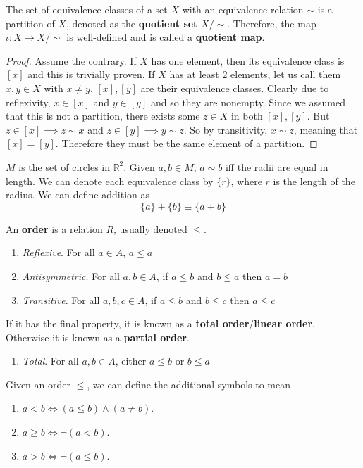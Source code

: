   \begin{theorem}
    \label{partition}
    The set of equivalence classes of a set $X$ with an equivalence relation $\sim$ is a partition of $X$, denoted as the \textbf{quotient set} $X/\sim$. Therefore, the map $\iota: X \rightarrow X/\sim$ is well-defined and is called a \textbf{quotient map}. 
  \end{theorem} 
  \begin{proof}
    Assume the contrary. If $X$ has one element, then its equivalence class is $[x]$ and this is trivially proven. If $X$ has at least 2 elements, let us call them $x, y \in X$ with $x \neq y$. $[x], [y]$ are their equivalence classes. Clearly due to reflexivity, $x \in [x]$ and $y \in [y]$ and so they are nonempty. Since we assumed that this is not a partition, there exists some $z \in X$ in both $[x], [y]$. But $z \in [x] \implies z \sim x$ and $z \in [y] \implies y \sim z$. So by transitivity, $x \sim z$, meaning that $[x] = [y]$. Therefore they must be the same element of a partition. 
  \end{proof}

  \begin{example}[Circles]
    $M$ is the set of circles in $\mathbb{R}^{2}$. Given $a, b \in M$, $a \sim b$ iff the radii are equal in length. We can denote each equivalence class by $\{ r \}$, where $r$ is the length of the radius. We can define addition as 
    \begin{equation}
      \{ a \} + \{ b \} \equiv \{ a + b\}
    \end{equation}
  \end{example}

  \begin{definition}[Order]
    An \textbf{order} is a relation $R$, usually denoted $\leq$. 
    \begin{enumerate}
      \item \textit{Reflexive}. For all $a \in A$, $a \leq a$
      \item \textit{Antisymmetric}. For all $a,b \in A$, if $a \leq b$ and $b \leq a$ then $a=b$
      \item \textit{Transitive}. For all $a,b,c \in A$, if $a \leq b$ and $b \leq c$ then $a \leq c$
    \end{enumerate} 
    If it has the final property, it is known as a \textbf{total order}/\textbf{linear order}. Otherwise it is known as a \textbf{partial order}. 
    \begin{enumerate}
      \item \textit{Total}. For all $a,b \in A$, either $a \leq b$ or $b \leq a$
    \end{enumerate} 
    Given an order $\leq$, we can define the additional symbols to mean 
    \begin{enumerate}
      \item $a < b \iff (a \leq b) \land (a \neq b)$. 
      \item $a \geq b \iff \neg(a < b)$. 
      \item $a > b \iff \neg(a \leq b)$. 
    \end{enumerate} 
  \end{definition} 

